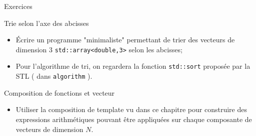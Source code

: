 \documentclass[handout,10pt]{beamer}
\begin{document}
\begin{frame}[fragile]{Exercices}
\tiny
\begin{exampleblock}{Trie selon l'axe des abcisses}
\begin{itemize}
\item \'Ecrire un programme "minimaliste" permettant de trier des vecteurs de dimension 3 \lstinline$std::array<double,3>$ selon les abcisses;
\item Pour l'algorithme de tri, on regardera la fonction \lstinline$std::sort$ proposée par la STL ( dans \lstinline$algorithm$ ).
\end{itemize}
\end{exampleblock}

\begin{block}{Composition de fonctions et vecteur}
\begin{itemize}
\item Utiliser la composition de template vu dans ce chapitre pour construire des expressions arithmétiques pouvant être appliquées
sur chaque composante de vecteurs de dimension $N$.
\end{itemize}
\end{block}
\end{frame}
\end{document}
